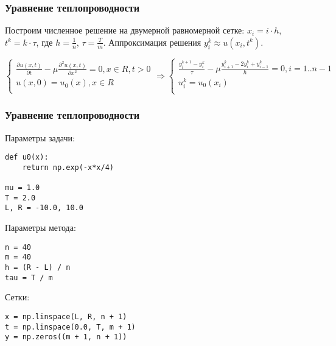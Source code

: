 \documentclass[10pt]{beamer}
\begin{document}
\begin{frame}[fragile]
\frametitle{Уравнение теплопроводности}
Построим численное решение на двумерной равномерной сетке:
$x_i = i \cdot h$, $t^k = k \cdot \tau$, где $h = \frac{1}{n}$, $\tau = \frac{T}{m}$. Аппроксимация решения $y_i^k \approx u(x_i, t^k)$.

\begin{center}
\end{center}

$$
\begin{cases} 
\frac{\partial u(x,t)}{\partial t} - \mu \frac{\partial^2 u(x,t)}{\partial x^2} = 0, x \in R, t > 0\\
u(x, 0) = u_0(x), x \in R\\
\end{cases}
\Rightarrow
\begin{cases} 
\frac{y^{k+1}_i - y^k_i}{\tau} - \mu \frac{y^{k}_{i+1} - 2 y^k_i + y^k_{i-1}}{h} = 0, i = 1..n-1\\
u_i^k = u_0(x_i)\\
\end{cases}
$$
\end{frame}

\begin{frame}[fragile]
\frametitle{Уравнение теплопроводности}
Параметры задачи:
\begin{lstlisting}
def u0(x):
    return np.exp(-x*x/4)

mu = 1.0
T = 2.0
L, R = -10.0, 10.0
\end{lstlisting}

Параметры метода:
\begin{lstlisting}
n = 40
m = 40
h = (R - L) / n
tau = T / m
\end{lstlisting}

Сетки:
\begin{lstlisting}
x = np.linspace(L, R, n + 1)
t = np.linspace(0.0, T, m + 1)
y = np.zeros((m + 1, n + 1))
\end{lstlisting}
\end{frame}
\end{document}
